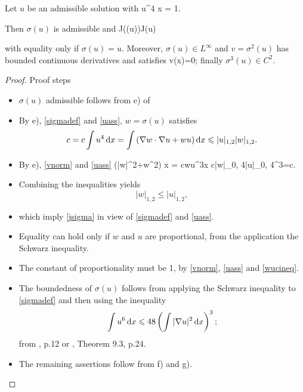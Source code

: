 \begin{lemma} 
Let $u$ be an admissible solution with
\be\label{uass} \int u^4 \diff x = 1.\ee

Then $\sigma(u)$ is admissible and
\be\label{jsigma}
J(\sigma(u))\leq J(u)
\ee

with equality only if $\sigma(u) = u$. Moreover, $\sigma(u)\in L^\infty$ 
and $v=\sigma^2(u)$ has bounded continuous derivatives and satisfies
\be\label{vlim}
 v(x)=0;
\ee
finally $\sigma^3(u)\in C^2$.
\end{lemma}
\begin{proof}
{\red Proof steps}
\begin{itemize}
    \item $\sigma(u)$ admissible follows from e) of 
    \item By e), \eqref{sigmadef} and \eqref{uass}, $w=\sigma(u)$ satisfies
        $$c=c\int u^4\mathop{}\!\mathrm{d} x=\int\left(\nabla w\cdot \nabla u + wu\right)\mathop{}\!\mathrm{d}
        x\leqslant |u|_{1, 2}|w|_{1, 2}.$$
    \item By e), \eqref{vnorm} and \eqref{uass}
        \be\label{wucineq} 
            \int\left(|\nabla w|^2+w^2\right) \diff x = c\int wu^3\diff x\leq
            c|w|_{0, 4}|u|_{0, 4}^3=c.
        \ee
    \item Combining the inequalities yields
        $$ |w|_{1, 2}\leq |u|_{1, 2},$$
    \item which imply \eqref{jsigma} in view of \eqref{sigmadef} and
        \eqref{uass}.
    \item Equality can hold only if $w$ and $u$ are proportional, from the
        application the Schwarz inequality.
    \item The constant of proportionality must be 1, by \eqref{vnorm},
        \eqref{uass} and \eqref{wucineq}.
    \item The boundedness of $\sigma(u)$ follows from applying the Schwarz
        inequality to \eqref{sigmadef} and then using the inequality
        $$\int u^6\mathop{}\!\mathrm{d} x\leqslant 48\left(\int|\nabla u|^2\mathop{}\!\mathrm{d} x\right)^3;$$
        from {, p.12} or {, Theorem 9.3, p.24}.
    \item The remaining assertions follow from f) and g).
\end{itemize}
\end{proof}

